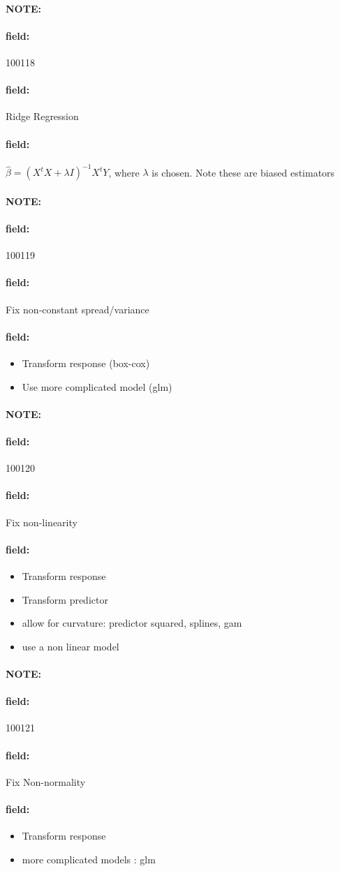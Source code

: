 \documentclass[12pt]{article}
\newenvironment{note}{\paragraph{NOTE:}}{}
\newenvironment{field}{\paragraph{field:}}{}
\begin{document}
\begin{note} \begin{field} \tiny 100118 \end{field}
 \begin{field}
  Ridge Regression
 \end{field}
 \begin{field}
  $\hat{\beta} = (X^tX + \lambda I)^{-1} X^t Y$, where $\lambda$ is chosen. Note these are biased estimators
 \end{field}
\end{note}

\begin{note} \begin{field} \tiny 100119 \end{field}
 \begin{field}
  Fix non-constant spread/variance
 \end{field}
 \begin{field}
  \begin{itemize}
   \item Transform response (box-cox)
   \item Use more complicated model (glm)
  \end{itemize}
 \end{field}
\end{note}

\begin{note} \begin{field} \tiny 100120 \end{field}
 \begin{field}
  Fix non-linearity
 \end{field}
 \begin{field}
  \begin{itemize}
   \item Transform response
   \item Transform predictor
   \item allow for curvature: predictor squared, splines, gam
   \item use a non linear model
  \end{itemize}
 \end{field}
\end{note}

\begin{note} \begin{field} \tiny 100121 \end{field}
 \begin{field}
  Fix Non-normality
 \end{field}
 \begin{field}
  \begin{itemize}
   \item Transform response
   \item more complicated models : glm
  \end{itemize}
 \end{field}
\end{note}
\end{document}

